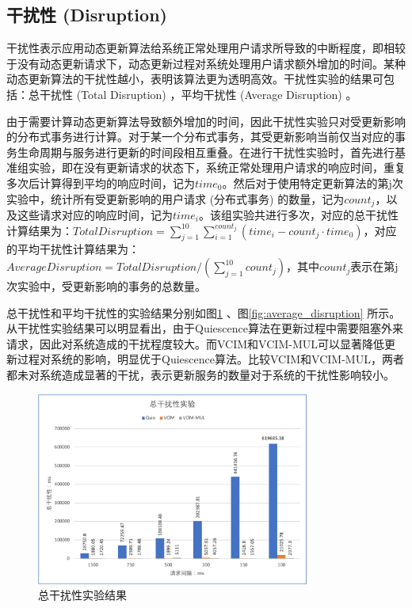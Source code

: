 \documentclass[macfonts,master]{njuthesis}
\begin{document}
\subsection{干扰性 (Disruption) }
干扰性表示应用动态更新算法给系统正常处理用户请求所导致的中断程度，即相较于没有动态更新请求下，动态更新过程对系统处理用户请求额外增加的时间。某种动态更新算法的干扰性越小，表明该算法更为透明高效。干扰性实验的结果可包括：总干扰性 (Total Disruption) ，平均干扰性 (Average Disruption) 。

由于需要计算动态更新算法导致额外增加的时间，因此干扰性实验只对受更新影响的分布式事务进行计算。对于某一个分布式事务，其受更新影响当前仅当对应的事务生命周期与服务进行更新的时间段相互重叠。在进行干扰性实验时，首先进行基准组实验，即在没有更新请求的状态下，系统正常处理用户请求的响应时间，重复多次后计算得到平均的响应时间，记为$time_0$。然后对于使用特定更新算法的第j次实验中，统计所有受更新影响的用户请求 (分布式事务) 的数量，记为$count_j$，以及这些请求对应的响应时间，记为$time_i$。该组实验共进行多次，对应的总干扰性计算结果为：$TotalDisruption = \sum_{j=1}^{10}\sum_{i=1}^{count_j} (time_i - count_j \cdot time_0) $，对应的平均干扰性计算结果为：$AverageDisruption = TotalDisruption /  (\sum_{j=1}^{10}count_j) $，其中$count_j$表示在第j次实验中，受更新影响的事务的总数量。

总干扰性和平均干扰性的实验结果分别如图\ref{fig:total_disruption} 、图\ref{fig:average_disruption} 所示。从干扰性实验结果可以明显看出，由于Quiescence算法在更新过程中需要阻塞外来请求，因此对系统造成的干扰程度较大。而VCIM和VCIM-MUL可以显著降低更新过程对系统的影响，明显优于Quiescence算法。比较VCIM和VCIM-MUL，两者都未对系统造成显著的干扰，表示更新服务的数量对于系统的干扰性影响较小。

\begin{figure}[!htbp]
  \centering
  \includegraphics[width= 0.8\textwidth]{image/total_disruption.png}
  \caption{总干扰性实验结果}
  \label{fig:total_disruption}
\end{figure}
\end{document}
